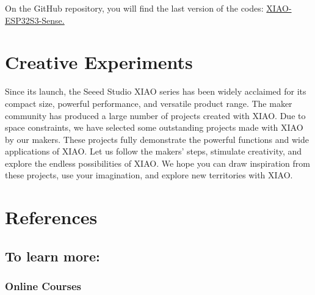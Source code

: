 \documentclass[
  letterpaper,
  DIV=11,
  numbers=noendperiod]{scrreprt}
\begin{document}
On the GitHub repository, you will find the last version of the codes:
\href{https://github.com/Mjrovai/XIAO-ESP32S3-Sense}{XIAO-ESP32S3-Sense.}


\hypertarget{creative-experiments}{%
\chapter{Creative Experiments}\label{creative-experiments}}

Since its launch, the Seeed Studio XIAO series has been widely acclaimed
for its compact size, powerful performance, and versatile product range.
The maker community has produced a large number of projects created with
XIAO. Due to space constraints, we have selected some outstanding
projects made with XIAO by our makers. These projects fully demonstrate
the powerful functions and wide applications of XIAO. Let us follow the
makers' steps, stimulate creativity, and explore the endless
possibilities of XIAO. We hope you can draw inspiration from these
projects, use your imagination, and explore new territories with XIAO.


\hypertarget{references}{%
\chapter*{References}\label{references}}


\hypertarget{to-learn-more}{%
\section*{To learn more:}\label{to-learn-more}}


\hypertarget{online-courses}{%
\subsection*{Online Courses}\label{online-courses}}
\end{document}
